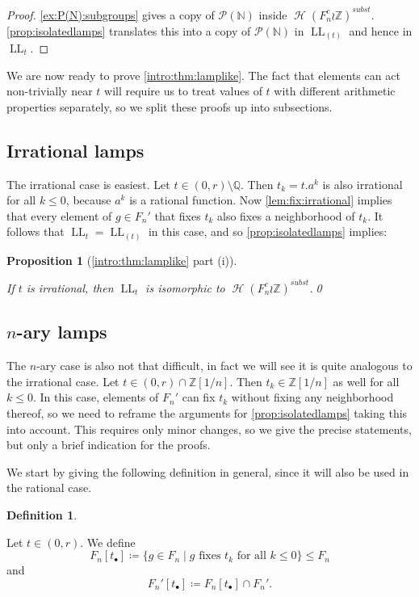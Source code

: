 \documentclass[reqno,12pt]{amsart}\setcounter{tocdepth}{1}
\newtheorem{proposition}[theorem]{Proposition}
\theoremstyle{definition}
\newtheorem{definition}[theorem]{Definition}
\newcommand{\N}{\mathbb{N}}
\newcommand{\Z}{\mathbb{Z}}
\newcommand{\Q}{\mathbb{Q}}
\DeclareMathOperator{\Hyp}{\mathcal{H}}
\DeclareMathOperator{\LL}{LL}
\numberwithin{equation}{section}
\begin{document}
\begin{proof}
\cref{ex:P(N):subgroups} gives a copy of $\mathcal{P}(\N)$ inside $\Hyp(F_n^c \wr \Z)^{subst}$. \cref{prop:isolatedlamps} translates this into a copy of $\mathcal{P}(\N)$ in $\LL_{(t)}$ and hence in $\LL_t$. 
\end{proof}

We are now ready to prove \cref{intro:thm:lamplike}. The fact that elements can act non-trivially near $t$ will require us to treat values of $t$ with different arithmetic properties separately, so we split these proofs up into subsections.

\subsection{Irrational lamps}

The irrational case is easiest. Let $t \in (0, r) \setminus \Q$. Then $t_k = t.a^k$ is also irrational for all $k \leq 0$, because $a^k$ is a rational function. Now \cref{lem:fix:irrational} implies that every element of $g \in F_n'$ that fixes $t_k$ also fixes a neighborhood of $t_k$. It follows that $\LL_t = \LL_{(t)}$ in this case, and so \cref{prop:isolatedlamps} implies:

\begin{proposition}[\cref{intro:thm:lamplike} part (i)]
\label{prop:irrationallamps}

If $t$ is irrational, then $\LL_t$ is isomorphic to $\Hyp(F_n^c \wr \Z)^{subst}$.\qed
\end{proposition}


\subsection{$n$-ary lamps}

The $n$-ary case is also not that difficult, in fact we will see it is quite analogous to the irrational case. Let $t \in (0, r) \cap \Z[1/n]$. Then $t_k \in \Z[1/n]$ as well for all $k \leq 0$. In this case, elements of $F_n'$ can fix $t_k$ without fixing any neighborhood thereof, so we need to reframe the arguments for \cref{prop:isolatedlamps} taking this into account. This requires only minor changes, so we give the precise statements, but only a brief indication for the proofs.

We start by giving the following definition in general, since it will also be used in the rational case.

\begin{definition}
\label{def:Fnt}

Let $t \in (0, r)$. We define
\[F_n[t_\bullet] \coloneqq \{ g \in F_n \mid g \text{ fixes } t_k \text{ for all } k \leq 0 \} \leq F_n\]
and
\[F_n'[t_\bullet] \coloneqq F_n[t_\bullet] \cap F_n'.\]
\end{definition}
\end{document}
